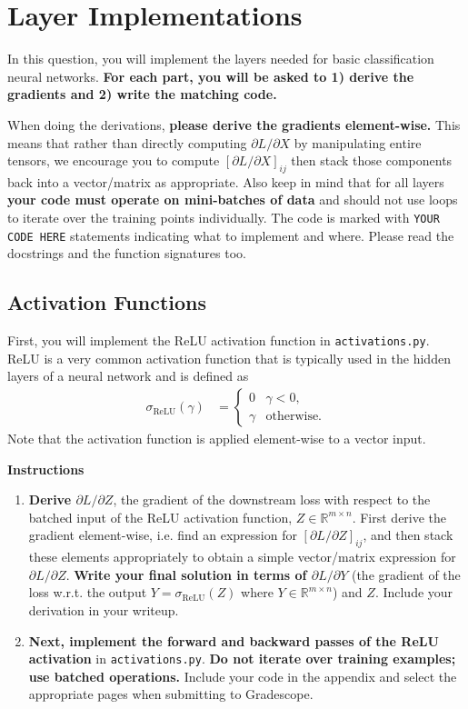 \documentclass{article}
\newcommand{\Question}[1]{\Large \section{ #1 } \normalsize}
\begin{document}
\fontsize{12}{15}\selectfont

\Question{Layer Implementations}

In this question, you will implement the layers needed for basic classification neural networks. 
\textbf{For each part, you will be asked to 1) derive the gradients and 2) write the matching code.} 

When doing the derivations, \textbf{please derive the gradients element-wise.} 
This means that rather than directly computing $\partial L/\partial X$ by manipulating entire tensors, we encourage you to compute $\left[\partial L/\partial X\right]_{ij}$ then stack those components back into a vector/matrix as appropriate. 
Also keep in mind that for all layers \textbf{your code must operate on mini-batches of data} and should not use loops to iterate over the training points individually. 
The code is marked with \texttt{YOUR CODE HERE} statements indicating what to implement and where. 
Please read the docstrings and the function signatures too. 

\subsection{Activation Functions}
First, you will implement the ReLU activation function in \texttt{activations.py}. 
ReLU is a very common activation function that is typically used in the hidden layers of a neural network and is defined as
\begin{align*}
    \sigma_{\text{ReLU}}(\gamma) &=\begin{cases}0 & \gamma<0, \\ \gamma & \text{otherwise.}\end{cases}
\end{align*}
Note that the activation function is applied element-wise to a vector input. 

\textbf{Instructions}
\begin{enumerate}
    \item 
    \textbf{Derive $\partial L/\partial Z$}, the gradient of the downstream loss with respect to the batched input of the ReLU activation function, $Z \in \mathbb{R}^{m\times n}$. 
    First derive the gradient element-wise, i.e. find an expression for $\left[\partial L/\partial Z\right]_{ij}$, and then stack these elements appropriately to obtain a simple vector/matrix expression for $\partial L/\partial Z$.
    \textbf{Write your final solution in terms of $\partial L/\partial Y$} (the gradient of the loss w.r.t. the output $Y = \sigma_{\text{ReLU}}(Z)$ where $Y \in \mathbb{R}^{m\times n}$) and $Z$. 
    Include your derivation in your writeup.
    
    \item 
    \textbf{Next, implement the forward and backward passes of the ReLU activation} in \texttt{activations.py}. 
    \textbf{Do not iterate over training examples; use batched operations.} 
    Include your code in the appendix and select the appropriate pages when submitting to Gradescope.
\end{enumerate}
\end{document}
